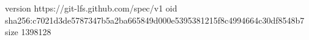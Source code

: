 version https://git-lfs.github.com/spec/v1
oid sha256:c7021d3de5787347b5a2ba665849d000e5395381215f8c4994664c30df8548b7
size 1398128
